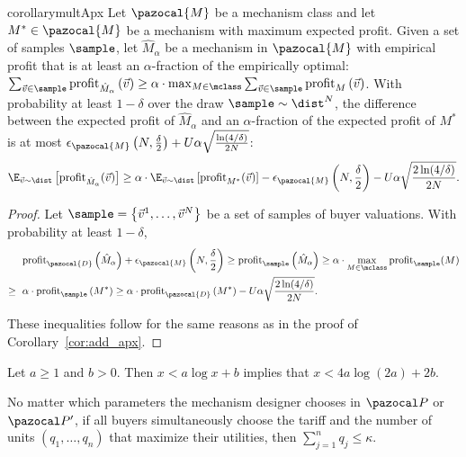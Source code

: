 \begin{restatable}{corollary}{multApx}\label{cor:mult_apx}
	Let $\pazocal{M}$ be a mechanism class and let $M^* \in \pazocal{M}$ be a mechanism with maximum expected profit. Given a set of samples $\sample$, let $\hat{M}_{\alpha}$ be a mechanism in $\pazocal{M}$ with empirical profit that is at least an $\alpha$-fraction of the empirically optimal: $\sum_{\vec{v} \in \sample} \profit_{\hat{M}_{\alpha}}\left(\vec{v}\right) \geq \alpha \cdot \max_{M \in \mclass} \sum_{\vec{v} \in \sample} \profit_{M}\left(\vec{v}\right) $. With probability at least $1-\delta$ over the draw $\sample \sim \dist^N$, the difference between the expected profit of $\hat{M}_{\alpha}$ and an $\alpha$-fraction of the expected profit of $M^*$ is at most $ \epsilon_{\pazocal{M}}\left(N, \frac{\delta}{2}\right) + U\alpha \sqrt{\frac{\ln(4/\delta)}{2N}}$: \[ \E_{\vec{v}\sim \dist}\left[{\normalfont \profit}_{\hat{M}_{\alpha}}(\vec{v})\right] \geq \alpha \cdot \E_{\vec{v}\sim \dist}\left[{\normalfont \profit}_{M^*}(\vec{v})\right] - \epsilon_{\pazocal{M}}\left(N, \frac{\delta}{2}\right) - U \alpha \sqrt{\frac{2\ln(4/\delta)}{2N}}.\]
\end{restatable}

\begin{proof}
Let $\sample = \left\{\vec{v}^1, \dots, \vec{v}^N\right\}$ be a set of samples of buyer valuations.
With probability at least $1-\delta$,
\begin{align*}
 &{\normalfont \profit}_{\pazocal{D}}\left(\hat{M}_{\alpha}\right) + \epsilon_{\pazocal{M}}\left(N, \frac{\delta}{2}\right) \geq   {\normalfont \profit}_{\sample}\left(\hat{M}_{\alpha}\right) \geq \alpha \cdot \max_{M \in \mclass} \profit_{\sample}(M)\\
 \geq  \text{ }&\alpha \cdot {\normalfont \profit}_{\sample}\left({M^*}\right) \geq \alpha \cdot {\normalfont \profit}_{\pazocal{D}}\left({M^*}\right) -  U \alpha \sqrt{\frac{2\ln(4/\delta)}{2N}}.
\end{align*}

These inequalities follow for the same reasons as in the proof of Corollary~\ref{cor:add_apx}.
\end{proof}

\begin{lemma}\label{lem:log_ineq}
Let $a \geq 1$ and $b > 0$. Then $x < a\log x + b$ implies that $x < 4a \log (2a) + 2b$.
\end{lemma}

\begin{lemma}\label{lem:kappa_bnded_2pt}
No matter which parameters the mechanism designer chooses in $\pspace$ or $\pspace'$, if all buyers simultaneously choose the tariff and the number of units $(q_1, \dots, q_n)$ that maximize their utilities, then $\sum_{j = 1}^n q_j \leq \kappa$.
\end{lemma}

